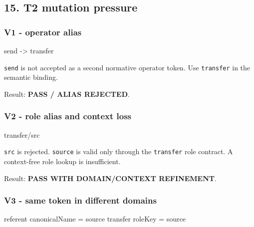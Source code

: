 \documentclass[
  10pt,
  a4paper,
]{article}
\newenvironment{Shaded}{}{}
\newcommand{\NormalTok}[1]{#1}
\begin{document}
\subsection{15. T2 mutation pressure}\label{t2-mutation-pressure}

\subsubsection{V1 - operator alias}\label{v1---operator-alias}

\begin{Shaded}
\begin{Highlighting}[]
\NormalTok{send {-}\textgreater{} transfer}
\end{Highlighting}
\end{Shaded}

\texttt{send} is not accepted as a second normative operator token. Use
\texttt{transfer} in the semantic binding.

Result: \textbf{PASS / ALIAS REJECTED}.

\subsubsection{V2 - role alias and context
loss}\label{v2---role-alias-and-context-loss}

\begin{Shaded}
\begin{Highlighting}[]
\NormalTok{transfer/src}
\end{Highlighting}
\end{Shaded}

\texttt{src} is rejected. \texttt{source} is valid only through the
\texttt{transfer} role contract. A context-free role lookup is
insufficient.

Result: \textbf{PASS WITH DOMAIN/CONTEXT REFINEMENT}.

\subsubsection{V3 - same token in different
domains}\label{v3---same-token-in-different-domains}

\begin{Shaded}
\begin{Highlighting}[]
\NormalTok{referent canonicalName = source}
\NormalTok{transfer roleKey       = source}
\end{Highlighting}
\end{Shaded}
\end{document}
